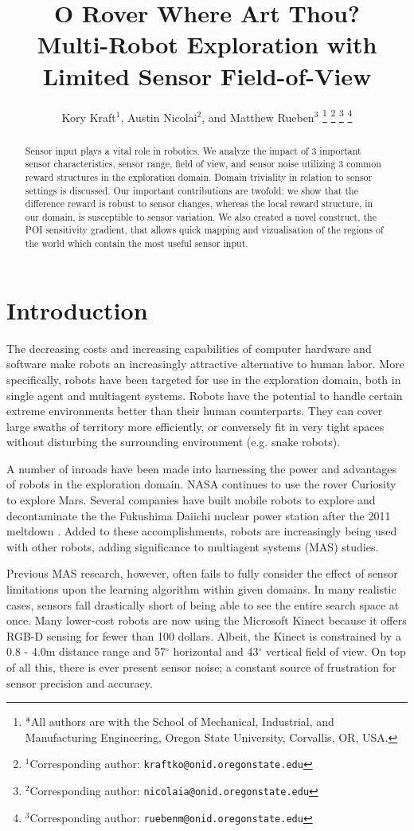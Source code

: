 \documentclass[letterpaper, 10 pt, conference]{ieeeconf}  %
\title{\LARGE \bf 
O Rover Where Art Thou?\\
Multi-Robot Exploration with Limited Sensor Field-of-View
}
\author{Kory Kraft$^{1}$, Austin Nicolai$^{2}$, and Matthew Rueben$^{3}$%
\thanks{*All authors are with the School of Mechanical, Industrial, and Manufacturing Engineering,
         Oregon State University,
         Corvallis, OR, USA. }%
\thanks{$^{1}$Corresponding author: {\tt\small kraftko@onid.oregonstate.edu}}%
\thanks{$^{2}$Corresponding author: {\tt\small nicolaia@onid.oregonstate.edu}}%
\thanks{$^{3}$Corresponding author: {\tt\small ruebenm@onid.oregonstate.edu}}%
}
\begin{document}
\maketitle
\thispagestyle{empty}
\pagestyle{empty}

\begin{abstract}
Sensor input plays a vital role in robotics.
We analyze the impact of 3 important sensor characteristics, sensor range,
field of view, and sensor noise utilizing 3 common reward structures in the 
exploration domain. Domain triviality in relation to sensor settings is discussed.
Our important contributions are twofold: we show that the 
difference reward is robust to sensor changes, whereas 
the local reward structure, in our domain, is susceptible to sensor variation.
We also created a novel construct, the POI sensitivity gradient, that allows
quick mapping and vizualisation of the regions of the world which
contain the most useful sensor input.  
\end{abstract}


\section{Introduction}
The decreasing costs and increasing capabilities of computer hardware and software make
robots an increasingly attractive alternative to human labor. More specifically, robots have 
been targeted for use in the exploration domain, both in single agent and 
multiagent systems.  Robots have the potential to
handle certain extreme environments better than their human
counterparts.  They can cover large swaths of territory more
efficiently, or conversely fit in very tight spaces without disturbing
the surrounding environment (e.g. snake robots). 

A number of inroads have been made into harnessing the power and
advantages of robots in the exploration domain. NASA continues to use
the rover Curiosity to explore Mars. Several companies have built
mobile robots to explore and decontaminate the the Fukushima Daiichi
nuclear power station after the 2011 meltdown \cite{nuclear_robots}. Added to these
accomplishments, robots are increasingly being used with other robots, 
adding significance to multiagent systems (MAS) studies.

Previous MAS research, however, often fails to fully consider the effect of
sensor limitations upon the learning algorithm within given domains. In many realistic cases, sensors fall drastically short of being able to see the entire search space at once. Many lower-cost robots are now using the Microsoft Kinect because it offers RGB-D sensing for fewer than 100 dollars. Albeit, the Kinect is constrained by a 0.8 - 4.0m distance range and 57$^{\circ}$ horizontal and 43$^{\circ}$ vertical field of view. On top of all this, there is ever present sensor noise; a constant source of frustration for sensor precision and accuracy.
\end{document}
